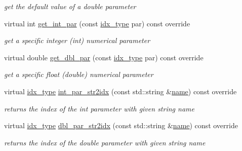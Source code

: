 \begin{Indent}
\begin{DoxyCompactItemize}
\begin{DoxyCompactList}\small\item\em get the default value of a double parameter \end{DoxyCompactList}\item 
virtual int \mbox{\hyperlink{class_s_m_spp__di__unipi__it_1_1_m_c_f_solver_aaaa5e72533153b149c26c1cc7ab1fe70}{get\+\_\+int\+\_\+par}} (const \mbox{\hyperlink{class_s_m_spp__di__unipi__it_1_1_thin_compute_interface_aa3d710629ad8c434286726ad810c3b47}{idx\+\_\+type}} par) const override
\begin{DoxyCompactList}\small\item\em get a specific integer (int) numerical parameter \end{DoxyCompactList}\item 
virtual double \mbox{\hyperlink{class_s_m_spp__di__unipi__it_1_1_m_c_f_solver_af7101b9f3e872b6ad9129ab99cff4cb7}{get\+\_\+dbl\+\_\+par}} (const \mbox{\hyperlink{class_s_m_spp__di__unipi__it_1_1_thin_compute_interface_aa3d710629ad8c434286726ad810c3b47}{idx\+\_\+type}} par) const override
\begin{DoxyCompactList}\small\item\em get a specific float (double) numerical parameter \end{DoxyCompactList}\item 
virtual \mbox{\hyperlink{class_s_m_spp__di__unipi__it_1_1_thin_compute_interface_aa3d710629ad8c434286726ad810c3b47}{idx\+\_\+type}} \mbox{\hyperlink{class_s_m_spp__di__unipi__it_1_1_m_c_f_solver_ae281b6699b0707a5cdc1e82b76d26c09}{int\+\_\+par\+\_\+str2idx}} (const std\+::string \&\mbox{\hyperlink{class_s_m_spp__di__unipi__it_1_1_solver_a81dba299d9c4ccc6c1e6be0a845142fd}{name}}) const override
\begin{DoxyCompactList}\small\item\em returns the index of the int parameter with given string name \end{DoxyCompactList}\item 
virtual \mbox{\hyperlink{class_s_m_spp__di__unipi__it_1_1_thin_compute_interface_aa3d710629ad8c434286726ad810c3b47}{idx\+\_\+type}} \mbox{\hyperlink{class_s_m_spp__di__unipi__it_1_1_m_c_f_solver_a6d353ac3d1200d9bea89235da61bc4f3}{dbl\+\_\+par\+\_\+str2idx}} (const std\+::string \&\mbox{\hyperlink{class_s_m_spp__di__unipi__it_1_1_solver_a81dba299d9c4ccc6c1e6be0a845142fd}{name}}) const override
\begin{DoxyCompactList}\small\item\em returns the index of the double parameter with given string name \end{DoxyCompactList}\item 

\end{DoxyCompactItemize}
\end{Indent}
